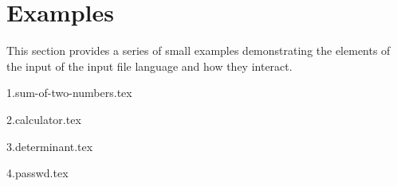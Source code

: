 
\chapter{Examples}
{
	This section provides a series of small examples
	demonstrating the elements of the input of the input file language
	and how they interact.
	
	{1.sum-of-two-numbers.tex}
	
	{2.calculator.tex}
	
	{3.determinant.tex}
	
	{4.passwd.tex}
}

